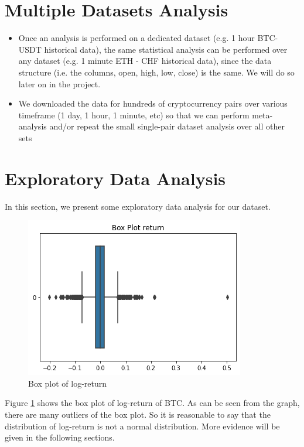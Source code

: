 \documentclass[twoside]{report}
\begin{document}
\begin{spacing}{1}
\begin{itemize}
\end{itemize}


\section{Multiple Datasets Analysis
}

\begin{itemize}
    \item 
Once an analysis is performed on a dedicated dataset (e.g. 1 hour BTC-USDT historical data), the same statistical analysis can be performed over any dataset (e.g. 1 minute ETH - CHF historical data), since the data structure (i.e. the columns, open, high, low, close) is the same. We will do so later on in the project.
    \item
We downloaded the data for hundreds of cryptocurrency pairs over various timeframe (1 day, 1 hour, 1 minute, etc) so that we can perform meta-analysis and/or repeat the small single-pair dataset analysis over all other sets

\end{itemize}


\section{Exploratory Data Analysis}
In this section, we present some exploratory data analysis for our dataset.

\begin{figure}[!htbp]
    \centering
    \includegraphics[scale = 0.5]{Images/Box Plot of Return.png}
    \caption{Box plot of log-return}
    \label{log return box}
\end{figure}

Figure \ref{log return box} shows the box plot of log-return of BTC. As can be seen from the graph, there are many outliers of the box plot. So it is reasonable to say that the distribution of log-return is not a normal distribution. More evidence will be given in the following sections.


\end{spacing}
\end{document}
